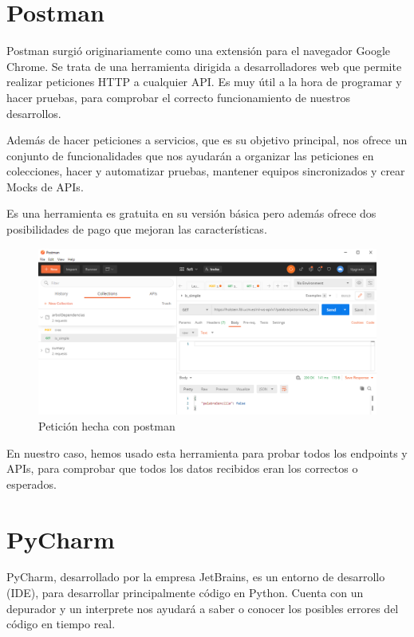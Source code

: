 \section{Postman}\label{sec:postman}

Postman surgió originariamente como una extensión para el navegador Google Chrome. Se trata de una herramienta dirigida a desarrolladores web que permite realizar peticiones HTTP a cualquier API. Es muy útil a la hora de programar y hacer pruebas, para comprobar el correcto funcionamiento de nuestros desarrollos.

Además de hacer peticiones a servicios, que es su objetivo principal, nos ofrece un conjunto de funcionalidades que nos ayudarán a organizar las peticiones en colecciones, hacer y automatizar pruebas, mantener equipos sincronizados y crear Mocks de APIs.

Es una herramienta es gratuita en su versión básica pero además ofrece dos posibilidades de pago que mejoran las características.
	\begin{figure}[h!]
	\centering
	
	
	\includegraphics[scale=0.7]{Imagenes/Figuras/postman}
	
	
	\caption{Petición hecha con postman}
	\label{fig:postman}
\end{figure}

En nuestro caso, hemos usado esta herramienta para probar todos los endpoints y APIs, para comprobar que todos los datos recibidos eran los correctos o esperados.

\section{PyCharm}

PyCharm, desarrollado por la empresa JetBrains, es un entorno de desarrollo (IDE), para desarrollar principalmente código en Python. Cuenta con un depurador y un interprete nos ayudará a saber o conocer los posibles errores del código en tiempo real. 

